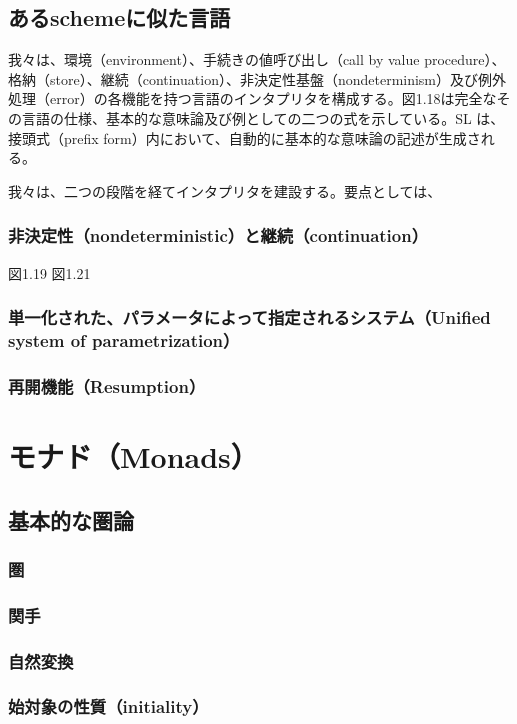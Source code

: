 \documentclass[11pt, oneside]{jsarticle}   	%
\begin{document}
\subsection{あるschemeに似た言語}
我々は、環境（environment）、手続きの値呼び出し（call by value procedure）、格納（store）、継続（continuation）、非決定性基盤（nondeterminism）及び例外処理（error）の各機能を持つ言語のインタプリタを構成する。図1.18は完全なその言語の仕様、基本的な意味論及び例としての二つの式を示している。SL は、接頭式（prefix form）内において、自動的に基本的な意味論の記述が生成される。

我々は、二つの段階を経てインタプリタを建設する。要点としては、

\subsubsection{非決定性（nondeterministic）と継続（continuation）}
図1.19 %
図1.21 %
\subsubsection{単一化された、パラメータによって指定されるシステム（Unified system of parametrization）}
\subsubsection{再開機能（Resumption）}

\section{ モナド（Monads）}
\subsection{基本的な圏論}
\subsubsection{ 圏 }
\subsubsection{ 関手 }
\subsubsection{ 自然変換 }
\subsubsection{ 始対象の性質（initiality）}
\end{document}
